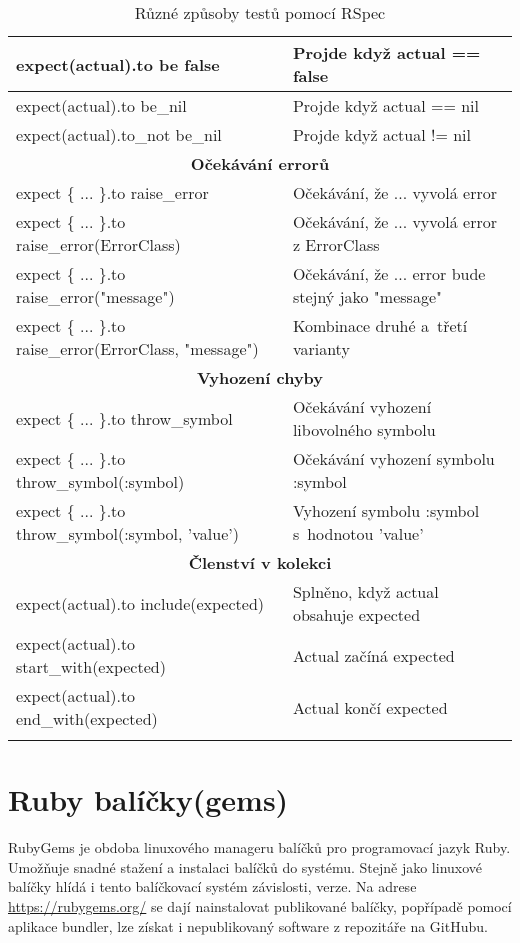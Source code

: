 \begin{center}
\begin{longtable}{| m{} | m{} |}
 \hline
 expect(actual).to be false   & Projde když actual == false \\
 \hline
 expect(actual).to be\_nil     & Projde když actual == nil \\
 \hline
 expect(actual).to\_not be\_nil & Projde když actual != nil \\
 \hline
 \multicolumn{2}{||c||}{\textbf{Očekávání errorů}}\\
 \hline
 expect \{ ... \}.to raise\_error & Očekávání, že ... vyvolá error \\
 \hline
 expect \{ ... \}.to raise\_error(ErrorClass) & Očekávání, že ... vyvolá error z ErrorClass\\
 \hline
 expect \{ ... \}.to raise\_error("message") & Očekávání, že ... error bude stejný jako "message" \\
 \hline
 expect \{ ... \}.to raise\_error(ErrorClass, "message")  & Kombinace druhé a~třetí varianty \\
 \hline
 \multicolumn{2}{||c||}{\textbf{Vyhození chyby}}\\
 \hline
 expect \{ ... \}.to throw\_symbol & Očekávání vyhození libovolného symbolu\\ 
 \hline
 expect \{ ... \}.to throw\_symbol(:symbol) & Očekávání vyhození symbolu :symbol\\ 
 \hline
 expect \{ ... \}.to throw\_symbol(:symbol, 'value') & Vyhození symbolu :symbol s~hodnotou 'value'\\ 
 \hline
 \multicolumn{2}{||c||}{\textbf{Členství v kolekci}}\\
 \hline
 expect(actual).to include(expected) & Splněno, když actual obsahuje expected \\
 \hline
 expect(actual).to start\_with(expected) & Actual začíná expected \\
 \hline
 expect(actual).to end\_with(expected) & Actual končí expected \\
 \hline
 \caption[RSpec metody testování]{Různé způsoby testů pomocí RSpec}\label{tab:rspec}
\end{longtable}
\end{center}

\section{Ruby balíčky(gems)}
\par RubyGems\cite{elmendorfdirk2006} je obdoba linuxového manageru balíčků pro programovací jazyk Ruby. Umožňuje snadné stažení a instalaci balíčků do systému. Stejně jako linuxové balíčky hlídá i tento balíčkovací systém závislosti, verze. Na adrese \url{https://rubygems.org/} se dají nainstalovat publikované balíčky, popřípadě pomocí aplikace bundler, lze získat i nepublikovaný software z repozitáře na GitHubu. 